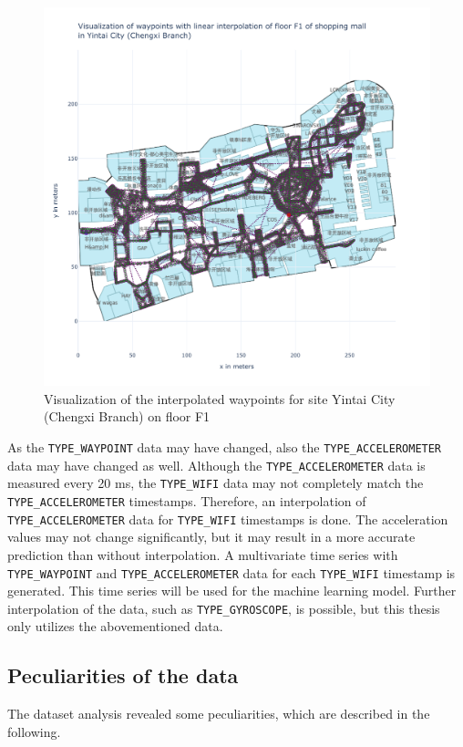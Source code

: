 \begin{figure}[h!]
    \centering
    \includegraphics[scale=0.6]{images/whole_floor_visualization_interpolated.pdf}
    \caption{Visualization of the interpolated waypoints for site Yintai City (Chengxi Branch) on floor F1}
    \label{fig:vis-interpolated}
\end{figure}

As the \texttt{TYPE\_WAYPOINT} data may have changed, also the \texttt{TYPE\_ACCELEROMETER} data may have changed as well.
Although the \texttt{TYPE\_ACCELEROMETER} data is measured every 20 ms, the \texttt{TYPE\_WIFI} data may not completely match the \texttt{TYPE\_ACCELEROMETER} timestamps.
Therefore, an interpolation of \texttt{TYPE\_ACCELEROMETER} data for \texttt{TYPE\_WIFI} timestamps is done.
The acceleration values may not change significantly, but it may result in a more accurate prediction than without interpolation.
A multivariate time series with \texttt{TYPE\_WAYPOINT} and \texttt{TYPE\_ACCELEROMETER} data for each \texttt{TYPE\_WIFI} timestamp is generated.
This time series will be used for the machine learning model.
Further interpolation of the data, such as \texttt{TYPE\_GYROSCOPE}, is possible, but this thesis only utilizes the abovementioned data.

\subsection{Peculiarities of the data}\label{sec:special-cases}
The dataset analysis revealed some peculiarities, which are described in the following.

